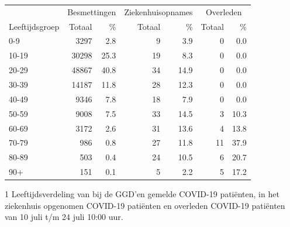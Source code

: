 \documentclass[
  english,
  man,floatsintext]{apa6}
\begin{document}
\begin{table}
\centering\begingroup\fontsize{11}{13}\selectfont

\begin{threeparttable}
\begin{tabular}{lrrrrrr}
\toprule
\multicolumn{1}{c}{ } & \multicolumn{2}{c}{Besmettingen} & \multicolumn{2}{c}{Ziekenhuisopnames} & \multicolumn{2}{c}{Overleden} \\
\cmidrule(l{3pt}r{3pt}){2-3} \cmidrule(l{3pt}r{3pt}){4-5} \cmidrule(l{3pt}r{3pt}){6-7}
Leeftijdsgroep & Totaal & \% & Totaal & \% & Totaal & \%\\
\midrule
0-9 & 3297 & 2.8 & 9 & 3.9 & 0 & 0.0\\
10-19 & 30298 & 25.3 & 19 & 8.3 & 0 & 0.0\\
20-29 & 48867 & 40.8 & 34 & 14.9 & 0 & 0.0\\
30-39 & 14187 & 11.8 & 28 & 12.3 & 0 & 0.0\\
40-49 & 9346 & 7.8 & 18 & 7.9 & 0 & 0.0\\
50-59 & 9008 & 7.5 & 33 & 14.5 & 3 & 10.3\\
60-69 & 3172 & 2.6 & 31 & 13.6 & 4 & 13.8\\
70-79 & 986 & 0.8 & 27 & 11.8 & 11 & 37.9\\
80-89 & 503 & 0.4 & 24 & 10.5 & 6 & 20.7\\
90+ & 151 & 0.1 & 5 & 2.2 & 5 & 17.2\\
\bottomrule
\end{tabular}
\begin{tablenotes}
\item[1] Leeftijdsverdeling van bij de GGD’en gemelde COVID-19 patiënten, in het ziekenhuis opgenomen COVID-19 patiënten en overleden COVID-19 patiënten van 10 juli t/m 24 juli 10:00 uur.
\end{tablenotes}
\end{threeparttable}
\endgroup{}
\end{table}

\newpage
\end{document}
